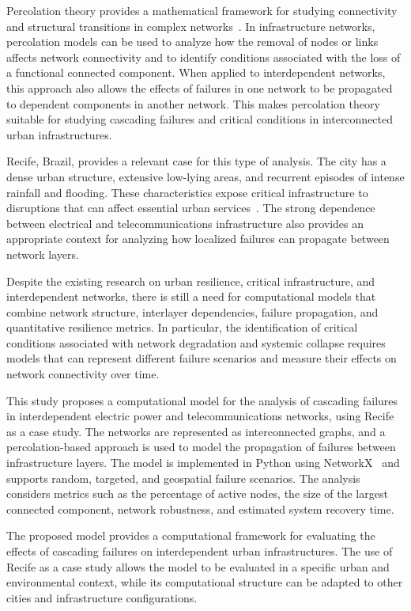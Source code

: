 \documentclass[journal]{IEEEtran}
\begin{document}
Percolation theory provides a mathematical framework for studying connectivity and structural transitions in complex networks~\cite{Li2021}. In infrastructure networks, percolation models can be used to analyze how the removal of nodes or links affects network connectivity and to identify conditions associated with the loss of a functional connected component. When applied to interdependent networks, this approach also allows the effects of failures in one network to be propagated to dependent components in another network. This makes percolation theory suitable for studying cascading failures and critical conditions in interconnected urban infrastructures.

Recife, Brazil, provides a relevant case for this type of analysis. The city has a dense urban structure, extensive low-lying areas, and recurrent episodes of intense rainfall and flooding. These characteristics expose critical infrastructure to disruptions that can affect essential urban services~\cite{tcepe2024}. The strong dependence between electrical and telecommunications infrastructure also provides an appropriate context for analyzing how localized failures can propagate between network layers.

Despite the existing research on urban resilience, critical infrastructure, and interdependent networks, there is still a need for computational models that combine network structure, interlayer dependencies, failure propagation, and quantitative resilience metrics. In particular, the identification of critical conditions associated with network degradation and systemic collapse requires models that can represent different failure scenarios and measure their effects on network connectivity over time.

This study proposes a computational model for the analysis of cascading failures in interdependent electric power and telecommunications networks, using Recife as a case study. The networks are represented as interconnected graphs, and a percolation-based approach is used to model the propagation of failures between infrastructure layers. The model is implemented in Python using NetworkX~\cite{hagberg2008} and supports random, targeted, and geospatial failure scenarios. The analysis considers metrics such as the percentage of active nodes, the size of the largest connected component, network robustness, and estimated system recovery time.

The proposed model provides a computational framework for evaluating the effects of cascading failures on interdependent urban infrastructures. The use of Recife as a case study allows the model to be evaluated in a specific urban and environmental context, while its computational structure can be adapted to other cities and infrastructure configurations.
\end{document}

